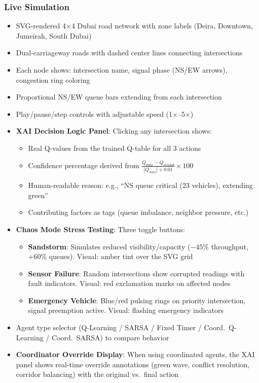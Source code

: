 \documentclass[12pt, a4paper]{article}
\begin{document}
\subsubsection{Live Simulation}
\begin{itemize}[nosep]
    \item SVG-rendered 4$\times$4 Dubai road network with zone labels (Deira, Downtown, Jumeirah, South Dubai)
    \item Dual-carriageway roads with dashed center lines connecting intersections
    \item Each node shows: intersection name, signal phase (NS/EW arrows), congestion ring coloring
    \item Proportional NS/EW queue bars extending from each intersection
    \item Play/pause/step controls with adjustable speed (1$\times$--5$\times$)
    \item \textbf{XAI Decision Logic Panel}: Clicking any intersection shows:
    \begin{itemize}[nosep]
        \item Real Q-values from the trained Q-table for all 3 actions
        \item Confidence percentage derived from $\frac{Q_{max} - Q_{second}}{|Q_{max}| + 0.01} \times 100$
        \item Human-readable reason: e.g., ``NS queue critical (23 vehicles), extending green''
        \item Contributing factors as tags (queue imbalance, neighbor pressure, etc.)
    \end{itemize}
    \item \textbf{Chaos Mode Stress Testing}: Three toggle buttons:
    \begin{itemize}[nosep]
        \item \textbf{Sandstorm}: Simulates reduced visibility/capacity ($-45\%$ throughput, $+60\%$ queues). Visual: amber tint over the SVG grid
        \item \textbf{Sensor Failure}: Random intersections show corrupted readings with fault indicators. Visual: red exclamation marks on affected nodes
        \item \textbf{Emergency Vehicle}: Blue/red pulsing rings on priority intersection, signal preemption active. Visual: flashing emergency indicators
    \end{itemize}
    \item Agent type selector (Q-Learning / SARSA / Fixed Timer / Coord.\ Q-Learning / Coord.\ SARSA) to compare behavior
    \item \textbf{Coordinator Override Display}: When using coordinated agents, the XAI panel shows real-time override annotations (green wave, conflict resolution, corridor balancing) with the original vs.\ final action
\end{itemize}
\end{document}

